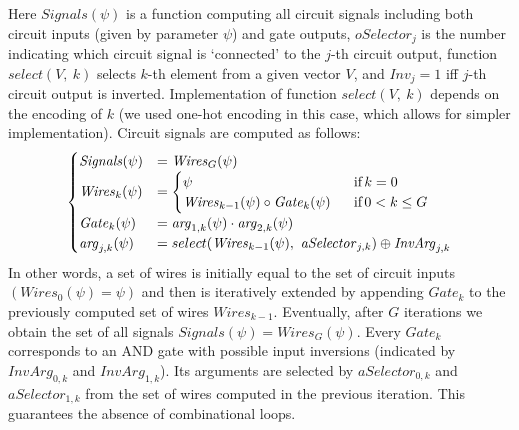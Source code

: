 Here $Signals(\psi)$ is a function computing all circuit signals
including both circuit inputs (given by parameter $\psi$) and gate
outputs, $\mathit{oSelector}_{j}$ is the number indicating which
circuit signal is `connected' to the $j$-th circuit output, function
$\mathit{select(V,\ k)}$ selects $k$-th element from a given vector
$V$, and $Inv_{j}=1$ iff $j$-th circuit output is inverted. Implementation
of function $select(V,\ k)$ depends on the encoding of $k$ (we used
one-hot encoding in this case, which allows for simpler implementation).
Circuit signals are computed as follows:
\[
\begin{cases}
\mathit{Signals}(\psi) & =\mathit{Wires}_{G}(\psi)\\
\mathit{Wires}_{k}(\psi) & =\begin{cases}
\psi & \textrm{\,\,\ if}\, k=0\\
\mathit{Wires}_{k-1}(\psi)\circ\mathit{Gate}_{k}(\psi) & \textrm{\,\,\ if}\,0<k\le G
\end{cases}\\
\mathit{Gate}_{k}(\psi) & =\mathit{arg}_{1,k}(\psi)\cdot\mathit{arg}_{2,k}(\psi)\\
\mathit{arg}_{j,k}(\psi) & =select(\mathit{Wires}_{k-1}(\psi),\ \mathit{aSelector}_{j,k})\oplus\mathit{InvArg}_{j,k}
\end{cases}
\]
In other words, a set of wires is initially equal to the set of circuit
inputs $(\mathit{Wires}_{0}(\psi)=\psi)$ and then is iteratively
extended by appending $Gate_{k}$ to the previously computed set of
wires $Wires_{k-1}$. Eventually, after $G$ iterations we obtain
the set of all signals $\mathit{Signals}(\psi)=\mathit{Wires}_{G}(\psi)$.
Every $Gate_{k}$ corresponds to an AND gate with possible input inversions
(indicated by $\mathit{InvArg}_{0,k}$ and $\mathit{InvArg}_{1,k}$).
Its arguments are selected by $\mathit{aSelector}_{0,k}$ and $\mathit{aSelector}_{1,k}$
from the set of wires computed in the previous iteration. This guarantees
the absence of combinational loops.

